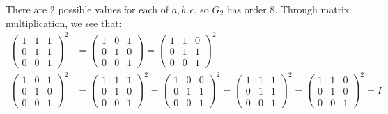 \begin{enumalph}
    \begin{Answer}
      There are $2$ possible values for each of $a, b, c$,
      so $G_2$ has order $8$.
      Through matrix multiplication, we see that:
      \begin{align}
        \begin{pmatrix}
          1 & 1 & 1 \\
          0 & 1 & 1 \\
          0 & 0 & 1
        \end{pmatrix}^2 &=
        \begin{pmatrix}
          1 & 0 & 1 \\
          0 & 1 & 0 \\
          0 & 0 & 1
        \end{pmatrix} =
        \begin{pmatrix}
          1 & 1 & 0 \\
          0 & 1 & 1 \\
          0 & 0 & 1
        \end{pmatrix}^2 \\
        \begin{pmatrix}
          1 & 0 & 1 \\
          0 & 1 & 0 \\
          0 & 0 & 1
        \end{pmatrix}^2 &=
        \begin{pmatrix}
          1 & 1 & 1 \\
          0 & 1 & 0 \\
          0 & 0 & 1
        \end{pmatrix}^2 =
        \begin{pmatrix}
          1 & 0 & 0 \\
          0 & 1 & 1 \\
          0 & 0 & 1
        \end{pmatrix}^2 =
        \begin{pmatrix}
          1 & 1 & 1 \\
          0 & 1 & 1 \\
          0 & 0 & 1
        \end{pmatrix}^2 =
        \begin{pmatrix}
          1 & 1 & 0 \\
          0 & 1 & 0 \\
          0 & 0 & 1
        \end{pmatrix}^2 = I
      \end{align}


\end{Answer}
\end{enumalph}
